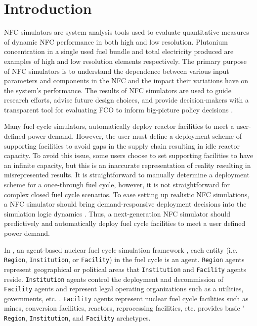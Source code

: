 \section{Introduction}
\gls{NFC} simulators are system analysis tools used to evaluate 
quantitative measures of dynamic \gls{NFC} performance 
in both high and low resolution. 
Plutonium concentration in a single used fuel bundle and 
total electricity produced are examples of high and low 
resolution elements respectively.  
The primary purpose of \gls{NFC} simulators is to understand the 
dependence between various input parameters and components 
in the \gls{NFC} and the impact their variations have on 
the system's performance. 
The results of \gls{NFC} simulators are used to guide research 
efforts, advise future design choices, and provide 
decision-makers with a transparent tool for evaluating \gls{FCO} 
to inform big-picture policy decisions \cite{yacout_modeling_2005}.

Many fuel cycle simulators, automatically deploy reactor facilities 
to meet a user-defined power demand. 
However, the user must define a deployment scheme of 
supporting facilities to avoid gaps in the supply 
chain resulting in idle reactor capacity. 
To avoid this issue, some users choose to set supporting 
facilities to have an infinite capacity, but this is an inaccurate 
representation of reality resulting in misrepresented results. 
It is straightforward to manually determine a deployment scheme 
for a once-through fuel cycle, however, it is not straightforward
for complex closed fuel cycle scenarios.  
To ease setting up realistic \gls{NFC} simulations, a \gls{NFC} simulator
should bring demand-responsive deployment decisions into 
the simulation logic dynamics \cite{huff_current_2017}. 
Thus, a next-generation \gls{NFC} simulator should predictively and 
automatically deploy fuel cycle facilities to meet a user defined 
power demand. 

In \Cyclus, an agent-based nuclear fuel cycle simulation framework 
\cite{huff_fundamental_2016}, 
each entity (i.e. \texttt{Region}, \texttt{Institution}, or \texttt{Facility}) in the 
fuel cycle is an agent. 
\texttt{Region} agents represent geographical or political areas that \texttt{Institution}
and \texttt{Facility} agents reside. 
\texttt{Institution} agents control the 
deployment and decommission of \texttt{Facility} agents 
and represent legal operating organizations such as a 
utilities, governments, etc. \cite{huff_fundamental_2016}. 
\texttt{Facility} agents represent nuclear fuel cycle facilities
such as mines, conversion facilities, reactors, reprocessing facilities, 
etc. 
\Cycamore \cite{carlsen_cycamore_2014}
provides basic \Cyclus' \texttt{Region}, \texttt{Institution}, 
and \texttt{Facility} archetypes. 

